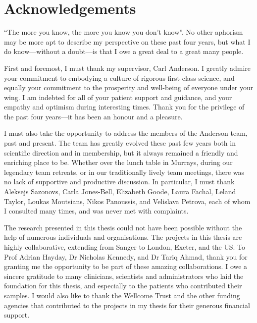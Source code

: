 %
%

\chapter{Acknowledgements}

\enquote{The more you know, the more you know you don't know}.
No other aphorism may be more apt to describe my perspective on these past four years,
but what I do know---without a doubt---is that I owe a great deal to a great many people.

First and foremost, I must thank my supervisor, Carl Anderson.
I greatly admire your commitment to embodying a culture of rigorous first-class science,
and equally your commitment to the prosperity and well-being of everyone under your wing. 
I am indebted for all of your patient support and guidance, 
and your empathy and optimism during interesting times.
Thank you for the privilege of the past four years---it has been an honour and a pleasure.

I must also take the opportunity to address the members of the Anderson team, past and present.
The team has greatly evolved these past few years both in scientific direction and in membership,
but it always remained a friendly and enriching place to be. 
Whether over the lunch table in Murrays,
during our legendary team retreats,
or in our traditionally lively team meetings,
there was no lack of supportive and productive discussion.
In particular, I must thank
    Aleksejs Sazonovs,
    Carla Jones-Bell,
    Elizabeth Goode,
    Laura Fachal,
    Leland Taylor,
    Loukas Moutsians, 
    Nikos Panoussis,
    and Velislava Petrova,
    each of whom I consulted many times,
    and was never met with complaints. 

The research presented in this thesis could not have been possible without the help of numerous individuals and organisations.
The projects in this thesis are highly collaborative, extending from Sanger to London, Exeter, and the US.
To Prof Adrian Hayday, Dr Nicholas Kennedy, and Dr Tariq Ahmad, thank you for granting me the opportunity to be part of these amazing collaborations.
I owe a sincere gratitude to many clinicians, scientists and administrators who laid the foundation for this thesis,
and especially to the patients who contributed their samples.
I would also like to thank the Wellcome Trust and the other funding agencies that contributed to the projects in my thesis for their generous financial support.

